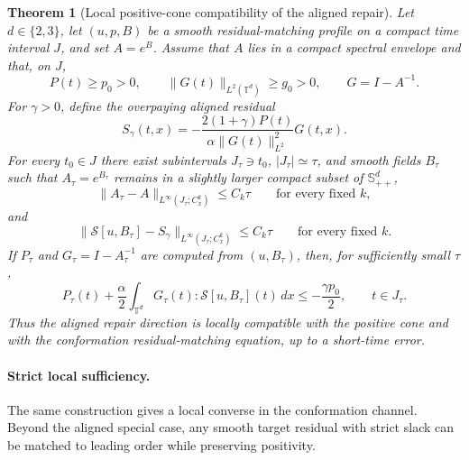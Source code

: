 \documentclass[11pt]{article}
\numberwithin{equation}{section}
\newtheorem{maintheorem}{Theorem}
\begin{document}
\begin{maintheorem}[Local positive-cone compatibility of the aligned repair]
\label{thm:local-corrector-main}
Let \(d\in\{2,3\}\), let \((u,p,B)\) be a smooth residual-matching profile on a
compact time interval \(J\), and set \(A=e^B\).  Assume that \(A\) lies in a
compact spectral envelope and that, on \(J\),
\[
  P(t)\ge p_0>0,
  \qquad
  \|G(t)\|_{L^2(\mathbb T^d)}\ge g_0>0,
  \qquad G=I-A^{-1}.
\]
For \(\gamma>0\), define the overpaying aligned residual
\[
  S_\gamma(t,x)
  =-
  \frac{2(1+\gamma)P(t)}{\alpha\|G(t)\|_{L^2}^2}
  G(t,x).
\]
For every \(t_0\in J\) there exist subintervals \(J_\tau\ni t_0\),
\(|J_\tau|\simeq\tau\), and smooth fields \(B_\tau\) such that
\(A_\tau=e^{B_\tau}\) remains in a slightly larger compact subset of
\(\mathbb S_{++}^d\),
\[
  \|A_\tau-A\|_{L^\infty(J_\tau;C^k_x)}\le C_k\tau
  \qquad\text{for every fixed }k,
\]
and
\[
  \|\mathcal S[u,B_\tau]-S_\gamma\|_{L^\infty(J_\tau;C^k_x)}\le C_k\tau
  \qquad\text{for every fixed }k.
\]
If \(P_\tau\) and \(G_\tau=I-A_\tau^{-1}\) are computed from \((u,B_\tau)\),
then, for sufficiently small \(\tau\),
\[
  P_\tau(t)+\frac{\alpha}{2}
  \int_{\mathbb T^d}G_\tau(t):\mathcal S[u,B_\tau](t)\,dx
  \le -\frac{\gamma p_0}{2},
  \qquad t\in J_\tau .
\]
Thus the aligned repair direction is locally compatible with the positive
cone and with the conformation residual-matching equation, up to a short-time
error.
\end{maintheorem}


\paragraph{Strict local sufficiency.}

The same construction gives a local converse in the conformation channel.
Beyond the aligned special case, any smooth target residual with strict slack
can be matched to leading order while preserving positivity.
\end{document}
